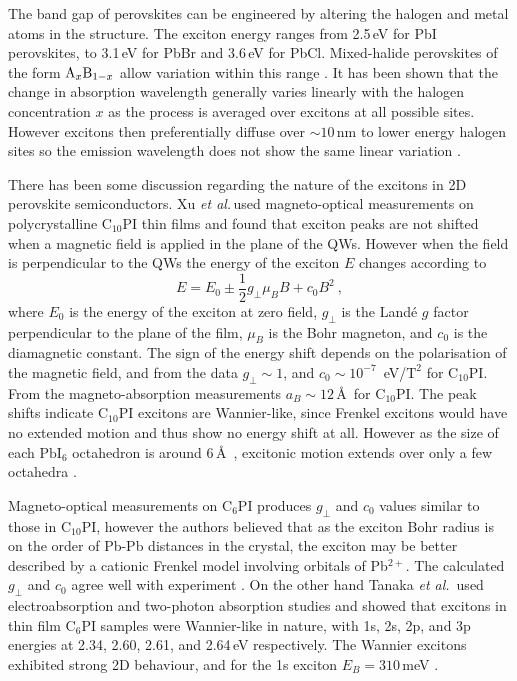 The band gap of perovskites can be engineered by altering the halogen and metal atoms in the structure. The exciton energy ranges from 2.5\,eV for PbI perovskites, to 3.1\,eV for PbBr and 3.6\,eV for PbCl. Mixed-halide perovskites of the form $\textnormal{A}_x\textnormal{B}_{1-x}$ allow variation within this range \cite{Kitazawa1996, Kitazawa1997}. It has been shown that the change in absorption wavelength generally varies linearly with the halogen concentration $x$ as the process is averaged over excitons at all possible sites. However excitons then preferentially diffuse over $\sim10$\,nm to lower energy halogen sites so the emission wavelength does not show the same linear variation \cite{Ahmad2013}.

There has been some discussion regarding the nature of the excitons in 2D perovskite semiconductors. Xu \textit{et al.}\,used magneto-optical measurements on polycrystalline $\textrm{C}_{10}$PI thin films and found that exciton peaks are not shifted when a magnetic field is applied in the plane of the QWs. However when the field is perpendicular to the QWs the energy of the exciton $E$ changes according to
\begin{equation}
E = E_0 \pm \frac{1}{2} g_{\bot} \mu_{B} B + c_0 B^2~,
\label{mag-shift}
\end{equation} 
where $E_0$ is the energy of the exciton at zero field, $g_{\bot}$ is the Land\'{e} $g$ factor perpendicular to the plane of the film, $\mu_B$ is the Bohr magneton, and $c_0$ is the diamagnetic constant. The sign of the energy shift depends on the polarisation of the magnetic field, and from the data $g_{\bot}\sim1$, and $c_0\sim 10^{-7}$~eV/$\textrm{T}^2$ for C$_{10}$PI. From the magneto-absorption measurements $a_B \sim12\,$\AA\, for $\textrm{C}_{10}$PI. The peak shifts indicate $\textrm{C}_{10}$PI excitons are Wannier-like, since Frenkel excitons would have no extended motion and thus show no energy shift at all. However as the size of each $\textrm{PbI}_6$ octahedron is around 6\,\AA~\cite{Ishihara1990}, excitonic motion extends over only a few octahedra \cite{Xu1991b}.

Magneto-optical measurements on C$_6$PI produces $g_{\bot}$ and $c_0$ values similar to those in $\textrm{C}_{10}$PI, however the authors believed that as the exciton Bohr radius is on the order of Pb-Pb distances in the crystal, the exciton may be better described by a cationic Frenkel model involving orbitals of Pb$^{2+}$. The calculated $g_{\bot}$ and $c_0$ agree well with experiment \cite{Kataoka1993}. On the other hand Tanaka \textit{et al.}\ used electroabsorption and two-photon absorption studies and showed that excitons in thin film $\textrm{C}_{6}$PI samples were Wannier-like in nature, with 1s, 2s, 2p, and 3p energies at 2.34, 2.60, 2.61, and 2.64\,eV respectively. The Wannier excitons exhibited strong 2D behaviour, and for the 1s exciton $E_B = 310$\,meV \cite{Tanaka2002}.




